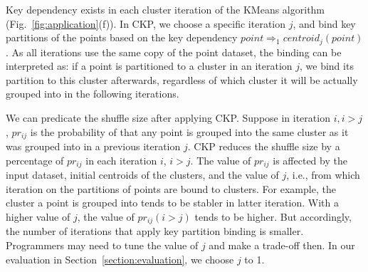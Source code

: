 \documentclass[10pt,journal,compsoc]{IEEEtran}
\newcommand{\red}[1]{\textcolor{red}{#1}}
\begin{document}
Key dependency exists in each cluster iteration of the KMeans algorithm (Fig.~\ref{fig:application}(f)).
In CKP, we choose a specific iteration $j$, and bind key partitions of 
the points based on the key dependency $point \Rightarrow_1 centroid_j(point)$.
As all iterations use the same copy of the point dataset,
the binding can be interpreted as: if a point is partitioned to a cluster 
in an iteration $j$, 
we bind its partition to this cluster afterwards,
regardless of which cluster it will be actually grouped into in the following iterations.

We can predicate the shuffle size after applying CKP.
Suppose in iteration $i, i > j$, 
$pr_{ij}$ is the probability of that any point is grouped 
into the same cluster as it was grouped into in a previous iteration $j$.
CKP reduces the shuffle size by a percentage of $pr_{ij}$ in each iteration $i$, $i>j$. 
The value of $pr_{ij}$ is affected by the input dataset, initial
centroids of the clusters, and the value of $j$, 
i.e., from which iteration on the partitions of points are bound to clusters.
For example, the cluster a point is grouped into tends to be stabler in latter iteration. With a higher value of $j$, 
the value of $pr_{ij} (i > j)$ tends to be higher.
But accordingly, the number of iterations that apply key partition 
binding is smaller. 
Programmers may need to tune the value of $j$ and make a trade-off then. 
In our evaluation in Section~\ref{section:evaluation}, we choose $j$ to 1.


\end{document}
